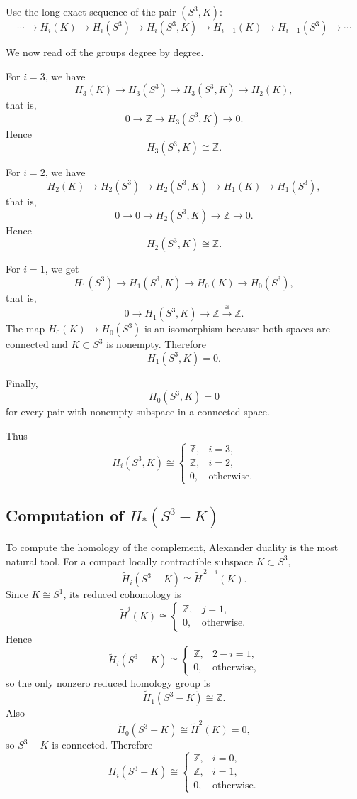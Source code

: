 \documentclass[12pt,a4paper]{article}
\theoremstyle{notespace}
\begin{document}
Use the long exact sequence of the pair \((S^3,K)\):
\[
\cdots \to H_i(K)\to H_i(S^3)\to H_i(S^3,K)\to H_{i-1}(K)\to H_{i-1}(S^3)\to \cdots
\]

We now read off the groups degree by degree.

For \(i=3\), we have
\[
H_3(K)\to H_3(S^3)\to H_3(S^3,K)\to H_2(K),
\]
that is,
\[
0\to \mathbb Z \to H_3(S^3,K)\to 0.
\]
Hence
\[
H_3(S^3,K)\cong \mathbb Z.
\]

For \(i=2\), we have
\[
H_2(K)\to H_2(S^3)\to H_2(S^3,K)\to H_1(K)\to H_1(S^3),
\]
that is,
\[
0\to 0 \to H_2(S^3,K)\to \mathbb Z \to 0.
\]
Hence
\[
H_2(S^3,K)\cong \mathbb Z.
\]

For \(i=1\), we get
\[
H_1(S^3)\to H_1(S^3,K)\to H_0(K)\to H_0(S^3),
\]
that is,
\[
0\to H_1(S^3,K)\to \mathbb Z \xrightarrow{\cong} \mathbb Z.
\]
The map \(H_0(K)\to H_0(S^3)\) is an isomorphism because both spaces are connected and \(K\subset S^3\) is nonempty. Therefore
\[
H_1(S^3,K)=0.
\]

Finally,
\[
H_0(S^3,K)=0
\]
for every pair with nonempty subspace in a connected space.

Thus
\[
H_i(S^3,K)\cong
\begin{cases}
	\mathbb Z, & i=3,\\[1mm]
	\mathbb Z, & i=2,\\[1mm]
	0, & \text{otherwise}.
\end{cases}
\]

\subsection{Computation of \(H_*(S^3-K)\)}

To compute the homology of the complement, Alexander duality is the most natural tool. For a compact locally contractible subspace \(K\subset S^3\),
\[
\widetilde H_i(S^3-K)\cong \widetilde H^{\,2-i}(K).
\]
Since \(K\cong S^1\), its reduced cohomology is
\[
\widetilde H^j(K)\cong
\begin{cases}
	\mathbb Z, & j=1,\\
	0, & \text{otherwise}.
\end{cases}
\]
Hence
\[
\widetilde H_i(S^3-K)\cong
\begin{cases}
	\mathbb Z, & 2-i=1,\\
	0, & \text{otherwise},
\end{cases}
\]
so the only nonzero reduced homology group is
\[
\widetilde H_1(S^3-K)\cong \mathbb Z.
\]
Also
\[
\widetilde H_0(S^3-K)\cong \widetilde H^2(K)=0,
\]
so \(S^3-K\) is connected. Therefore
\[
H_i(S^3-K)\cong
\begin{cases}
	\mathbb Z, & i=0,\\[1mm]
	\mathbb Z, & i=1,\\[1mm]
	0, & \text{otherwise}.
\end{cases}
\]
\end{document}
